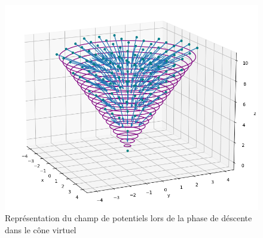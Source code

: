 \begin{figure}[H]
    \centering\includegraphics[width=150mm]{images/phases_approche/potent_phase_2.png}
    \caption{Représentation du champ de potentiels lors de la phase de déscente dans le cône virtuel}
\end{figure}